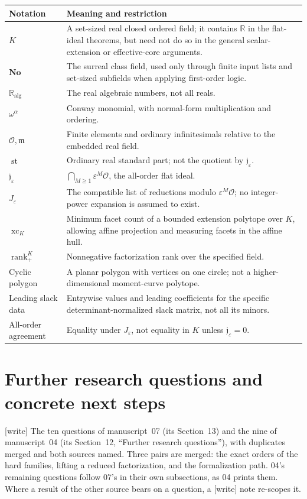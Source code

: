\documentclass[11pt,a4paper]{article}
\numberwithin{equation}{section}
\theoremstyle{plain}
\newcommand{\wtag}{\textup{[write]}}%
\newcommand{\No}{\mathbf{No}}
\newcommand{\R}{\mathbb R}
\newcommand{\eps}{\varepsilon}
\newcommand{\st}{\operatorname{st}}
\newcommand{\A}{\mathbb R_{\mathrm{alg}}}
\newcommand{\OO}{\mathcal O}
\newcommand{\mm}{\mathfrak m}
\newcommand{\xc}{\operatorname{xc}}
\newcommand{\nrk}{\operatorname{rank}_{+}}
\newcommand{\JJ}{\mathfrak j}
\begin{document}
\begingroup
\small
\begin{longtable}{@{}>{\raggedright\arraybackslash}p{}>{\raggedright\arraybackslash}p{}@{}}
\toprule
Notation & Meaning and restriction\\
\midrule
\endhead
$K$ & A set-sized real closed ordered field; it contains $\R$ in the
flat-ideal theorems, but need not do so in the general scalar-extension
or effective-core arguments.\\
$\No$ & The surreal class field, used only through finite input lists
and set-sized subfields when applying first-order logic.\\
$\A$ & The real algebraic numbers, not all reals.\\
$\omega^\alpha$ & Conway monomial, with normal-form multiplication and
ordering.\\
$\OO,\mm$ & Finite elements and ordinary infinitesimals relative to the
embedded real field.\\
$\st$ & Ordinary real standard part; not the quotient by $\JJ_\eps$.\\
$\JJ_\eps$ & $\bigcap_{M\geq1}\eps^M\OO$, the all-order flat ideal.\\
$J_\eps$ & The compatible list of reductions modulo $\eps^M\OO$; no
integer-power expansion is assumed to exist.\\
$\xc_K$ & Minimum facet count of a bounded extension polytope over $K$,
allowing affine projection and measuring facets in the affine hull.\\
$\nrk^K$ & Nonnegative factorization rank over the specified field.\\
Cyclic polygon & A planar polygon with vertices on one circle; not a
higher-dimensional moment-curve polytope.\\
Leading slack data & Entrywise values and leading coefficients for the
specific determinant-normalized slack matrix, not all its minors.\\
All-order agreement & Equality under $J_\eps$, not equality in $K$ unless
$\JJ_\eps=0$.\\
\bottomrule
\end{longtable}
\endgroup

\section{Further research questions and concrete next steps}\label{poly:ic:sec:questions}\label{poly:bao:sec:questions}

\wtag{} The ten questions of manuscript~07 (its Section~13) and the nine of
manuscript~04 (its Section~12, ``Further research questions''), with
duplicates merged and both sources named. Three pairs are merged: the exact
orders of the hard families, lifting a reduced factorization, and the
formalization path. 04's remaining questions follow 07's in their own
subsections, as 04 prints them. Where a result of the other source bears
on a question, a \wtag{} note re-scopes it.
\end{document}
